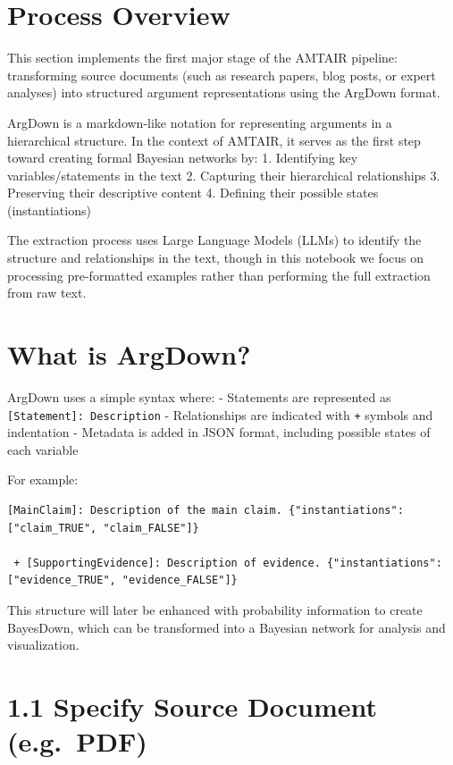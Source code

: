 \documentclass[
  11pt,
  letterpaper,
]{book}
\begin{document}
\section{Process Overview}\label{process-overview}

This section implements the first major stage of the AMTAIR pipeline:
transforming source documents (such as research papers, blog posts, or
expert analyses) into structured argument representations using the
ArgDown format.

ArgDown is a markdown-like notation for representing arguments in a
hierarchical structure. In the context of AMTAIR, it serves as the first
step toward creating formal Bayesian networks by: 1. Identifying key
variables/statements in the text 2. Capturing their hierarchical
relationships 3. Preserving their descriptive content 4. Defining their
possible states (instantiations)

The extraction process uses Large Language Models (LLMs) to identify the
structure and relationships in the text, though in this notebook we
focus on processing pre-formatted examples rather than performing the
full extraction from raw text.

\section{What is ArgDown?}\label{what-is-argdown}

ArgDown uses a simple syntax where: - Statements are represented as
\texttt{{[}Statement{]}:\ Description} - Relationships are indicated
with \texttt{+} symbols and indentation - Metadata is added in JSON
format, including possible states of each variable

For example:

\begin{verbatim}
[MainClaim]: Description of the main claim. {"instantiations": ["claim_TRUE", "claim_FALSE"]}

 + [SupportingEvidence]: Description of evidence. {"instantiations": ["evidence_TRUE", "evidence_FALSE"]}
\end{verbatim}

This structure will later be enhanced with probability information to
create BayesDown, which can be transformed into a Bayesian network for
analysis and visualization.

\section{1.1 Specify Source Document
(e.g.~PDF)}\label{specify-source-document-e.g.-pdf}
\end{document}
